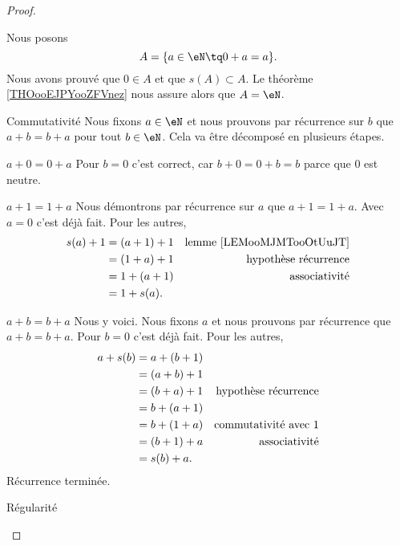\begin{proof}
\begin{subproof}
        Nous posons
        \begin{equation}
            A=\{ a\in \eN\tq 0+a=a \}.
        \end{equation}
        Nous avons prouvé que \( 0\in A\) et que \( s(A)\subset A\). Le théorème \ref{THOooEJPYooZFVnez} nous assure alors que \( A=\eN\).
    \item[Commutativité]
        Nous fixons \( a\in \eN\) et nous prouvons par récurrence sur \( b\) que \( a+b=b+a\) pour tout \( b\in \eN\). Cela va être décomposé en plusieurs étapes.
    \item[\( a+0=0+a\)]
        Pour \( b=0\) c'est correct, car \( b+0=0+b=b\) parce que \( 0\) est neutre.
    \item[\( a+1=1+a\)]
        Nous démontrons par récurrence sur \( a\) que \( a+1=1+a\). Avec \( a=0\) c'est déjà fait. Pour les autres,
        \begin{subequations}
            \begin{align}
                s(a)+1&=(a+1)+1 & \text{lemme \ref{LEMooMJMTooOtUuJT}}\\
                &=(1+a)+1       & \text{hypothèse récurrence}\\
                &=1+(a+1)       & \text{associativité}\\
                &=1+s(a).
            \end{align}
        \end{subequations}
    \item[\( a+b=b+a\)]
        Nous y voici. Nous fixons \( a\) et nous prouvons par récurrence que \( a+b=b+a\). Pour \( b=0\) c'est déjà fait. Pour les autres,
        \begin{subequations}
            \begin{align}
                a+s(b)&=a+(b+1)\\
                &=(a+b)+1\\
                &=(b+a)+1       &   \text{hypothèse récurrence}\\
                &=b+(a+1)\\
                &=b+(1+a)       &   \text{commutativité avec \( 1\)}\\
                &=(b+1)+a       &   \text{associativité}\\
                &=s(b)+a.
            \end{align}
        \end{subequations}
        Récurrence terminée.
    \item[Régularité]

\end{subproof}
\end{proof}
